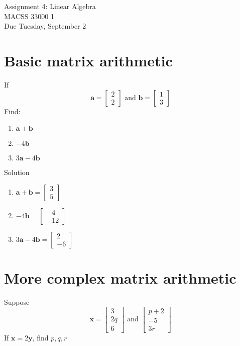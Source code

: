 \documentclass[12pt]{article}
\begin{document}
	\begin{center}
		Assignment 4: Linear Algebra\\
        MACSS 33000 1 \\
		Due Tuesday, September 2 \\
	\end{center}
 
\section{Basic matrix arithmetic}
If
\[ \mathbf{a} = \begin{bmatrix}
    2 \\ 2
\end{bmatrix} \text{ and }\mathbf{b} = \begin{bmatrix}
    1 \\ 3
\end{bmatrix} \]
Find:
\begin{enumerate}
    \item $\mathbf{a}+\mathbf{b}$
    \item $-4\mathbf{b}$
    \item $3\mathbf{a} - 4\mathbf{b}$
\end{enumerate}
Solution
\begin{enumerate}
    \item $\mathbf{a}+\mathbf{b} = \begin{bmatrix}    3 \\ 5\end{bmatrix} $
    \item $-4\mathbf{b} =  \begin{bmatrix}    -4 \\ -12 \end{bmatrix}$
    \item $3\mathbf{a} - 4\mathbf{b} =  \begin{bmatrix}    2 \\ -6\end{bmatrix}$
\end{enumerate}

\section{More complex matrix arithmetic}
Suppose
\[ \mathbf{x} =  \begin{bmatrix}    3 \\ 2q \\ 6 \end{bmatrix} \text{ and } \begin{bmatrix}
    p+2 \\-5 \\ 3r
\end{bmatrix} \]
If $\mathbf{x} = 2\mathbf{y}$, find $p,q,r$
\end{document}
